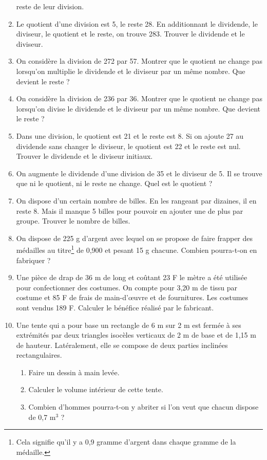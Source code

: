 \begin{enumerate}
 reste de leur division. 
 \item Le quotient d'une division est 5, le reste 28. 
 En additionnant le dividende, le diviseur, le
 quotient et le reste, on trouve 283. Trouver 
 le dividende et le diviseur.
 \item On considère la division de 272 par 57. Montrer que le quotient ne change pas lorsqu'on multiplie le dividende et le diviseur par un même nombre. Que devient le reste ? 
 \item On considère la division de 236 par 36. Montrer que le quotient ne change pas lorsqu'on divise le dividende et le diviseur par un même nombre. Que devient le reste ? 
 \item Dans une division, le quotient est 21 et le
 reste est 8. Si on ajoute 27 au dividende
 sans changer le diviseur, le quotient est 22 et le
 reste est nul. Trouver le dividende et le diviseur 
 initiaux. 
 \item On augmente le dividende d'une division de 
 35 et le diviseur de 5. Il se trouve que ni le 
 quotient, ni le reste ne change. Quel est le quotient
 ?
 \item On dispose d'un certain nombre de billes. 
 En les rangeant par dizaines, il en reste 8. Mais il manque 5 billes pour pouvoir en ajouter une de plus par groupe. Trouver le nombre de billes. 
 \item On dispose de 225 g d'argent avec lequel on se propose de faire frapper des médailles au titre\footnote{Cela signifie qu'il y a 0,9 gramme d'argent dans chaque gramme de la médaille.} de 
 0,900 et pesant 15 g chacune. Combien pourra-t-on 
 en fabriquer ? 
 \item Une pièce de drap de 36 m de long et coûtant 
 23 F le mètre a été utilisée pour confectionner
 des costumes. On compte pour 3,20 m de tissu par 
 costume et 85 F de frais de main-d'œuvre et de fournitures. Les costumes sont vendus 189 F. Calculer 
 le bénéfice réalisé par le fabricant. 
 \item Une tente qui a pour base un rectangle de 6 m sur 2 m est fermée à ses extrémités par deux triangles isocèles verticaux de 2 m de base et de 1,15 m de 
 hauteur. Latéralement, elle se compose de deux parties inclinées rectangulaires. 
 \begin{enumerate}
 \item Faire un dessin à main levée.
 \item Calculer le volume intérieur de cette tente.  \item Combien d'hommes pourra-t-on
 y abriter si l'on veut que chacun dispose de 0,7 m${}^3$ ?

\end{enumerate}
\end{enumerate}
